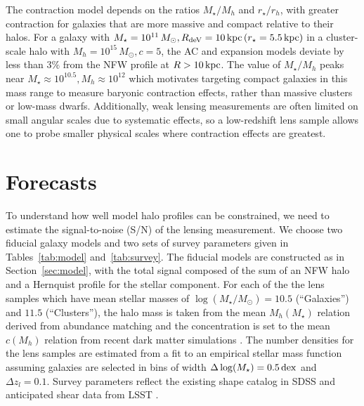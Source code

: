 \documentclass[12pt]{emulateapj}
\begin{document}
The contraction model depends on the ratios $M_{\star}/M_h$ and
$r_{\star}/r_h$, with greater contraction for galaxies that are more
massive and compact relative to their halos. For a galaxy with
$M_{\star}=10^{11}\,M_{\odot}, R_{\rm deV}=10\,{\rm kpc}\,
(r_\star=5.5\,{\rm kpc})$ in a
cluster-scale halo with $M_{h}=10^{15}\,M_{\odot}, c=5$, the AC and
expansion models deviate by less than $3\%$ from the NFW profile at
$R>10\,{\rm kpc}$. The value of $M_{\star}/M_{h}$ peaks near
$M_{\star}\approx10^{10.5}, M_h\approx10^{12}$
\citep[e.g.][]{Conroy2009, Behroozi2010, Leauthaud2012} which
motivates targeting compact galaxies in this mass range to measure
baryonic contraction effects, rather than massive clusters or low-mass
dwarfs. Additionally, weak lensing measurements are often limited on 
small angular scales due to systematic effects, so a low-redshift lens
sample allows one to probe smaller physical scales where contraction
effects are greatest.


\section{Forecasts}

To understand how well model halo profiles can be constrained, we need
to estimate the signal-to-noise (S/N) of the lensing measurement. We
choose two fiducial galaxy models and two sets of survey parameters
given in Tables~\ref{tab:model} and~\ref{tab:survey}.  The fiducial
models are constructed as in Section~\ref{sec:model}, with the total
signal composed of the sum of an NFW halo and a Hernquist profile for
the stellar component. For each of the the lens samples which have
mean stellar masses of $\log(M_{\star}/M_{\odot})=10.5$ (``Galaxies'')
and $11.5$ (``Clusters''), the halo mass is taken from the mean
$M_h(M_\star)$ relation derived from abundance matching
\citep{Behroozi2010} and the concentration is set to the mean $c(M_h)$
relation from recent dark matter simulations \citep{Klypin2011}. The
number densities for the lens samples are estimated from a fit to an
empirical stellar mass function \citep{Li2009} assuming galaxies are
selected in bins of width $\Delta\log(M_{\star})=0.5\,{\rm dex}$ and
$\Delta z_l=0.1$. Survey parameters reflect the existing shape catalog
in SDSS \citep{Reyes2012} and anticipated shear data from LSST
\citep{Chang2013}.
\end{document}
